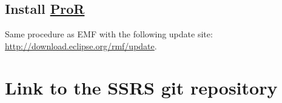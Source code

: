 \documentclass{openetcs_report}
\begin{document}
\subsection{Install \href{http://www.eclipse.org/rmf/pror/}{ProR}}
Same procedure as EMF with the following update site:
\url{http://download.eclipse.org/rmf/update}.

\section{Link to the SSRS git repository}

\end{document}
